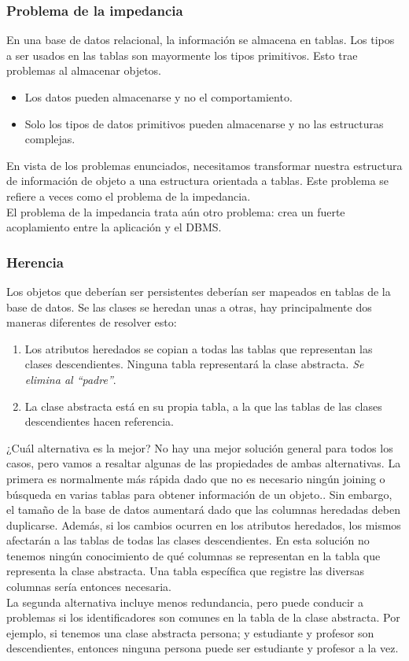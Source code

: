 \subsubsection{Problema de la impedancia}
En una base de datos relacional, la información se almacena en tablas. Los tipos a ser usados en las tablas son mayormente los tipos primitivos. Esto trae problemas al almacenar objetos.
\begin{itemize}
\item Los datos pueden almacenarse y no el comportamiento.
\item Solo los tipos de datos primitivos pueden almacenarse y no las estructuras complejas.
\end{itemize}
En vista de los problemas enunciados, necesitamos transformar nuestra estructura de información de objeto a una estructura orientada a tablas. Este problema se refiere a veces como el problema de la impedancia.\\
El problema de la impedancia trata aún otro problema: crea un fuerte acoplamiento entre la aplicación y el DBMS.\\
\subsubsection{Herencia}
Los objetos que deberían ser persistentes deberían ser mapeados en tablas de la base de datos. Se las clases se heredan unas a otras, hay principalmente dos maneras diferentes de resolver esto:
\begin{enumerate}
\item Los atributos heredados se copian a todas las tablas que representan las clases descendientes. Ninguna tabla representará la clase abstracta. \emph{Se elimina al ``padre''}.
\item La clase abstracta está en su propia tabla, a la que las tablas de las clases descendientes hacen referencia.
\end{enumerate}
¿Cuál alternativa es la mejor? No hay una mejor solución general para todos los casos, pero vamos a resaltar algunas de las propiedades de ambas alternativas. La primera es normalmente más rápida dado que no es necesario ningún joining o búsqueda en varias tablas para obtener información de un objeto.. Sin embargo, el tamaño de la base de datos aumentará dado que las columnas heredadas deben duplicarse. Además, si los cambios ocurren en los atributos heredados, los mismos afectarán a las tablas de todas las clases descendientes. En esta solución no tenemos ningún conocimiento de qué columnas se representan en la tabla que representa la clase abstracta. Una tabla específica que registre las diversas columnas sería entonces necesaria.\\
La segunda alternativa incluye menos redundancia, pero puede conducir a problemas si los identificadores son comunes en la tabla de la clase abstracta. Por ejemplo, si tenemos una clase abstracta persona; y estudiante y profesor son descendientes, entonces ninguna persona puede ser estudiante y profesor a la vez.
